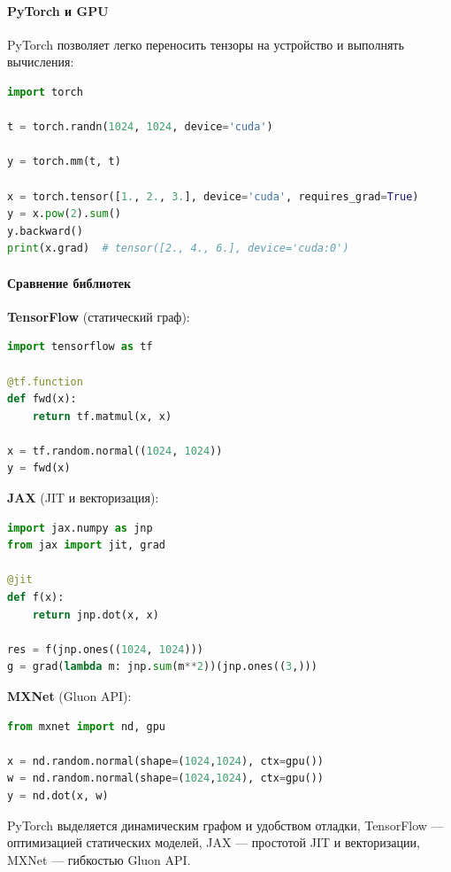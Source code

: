 \paragraph{PyTorch и GPU}
PyTorch позволяет легко переносить тензоры на устройство и выполнять вычисления:

\begin{lstlisting}[language=Python,caption={PyTorch: базовые операции на GPU},label={lst:torch_gpu}]
import torch

t = torch.randn(1024, 1024, device='cuda')

y = torch.mm(t, t)

x = torch.tensor([1., 2., 3.], device='cuda', requires_grad=True)
y = x.pow(2).sum()
y.backward()
print(x.grad)  # tensor([2., 4., 6.], device='cuda:0')
\end{lstlisting}

\paragraph{Сравнение библиотек}
\textbf{TensorFlow} (статический граф):
\begin{lstlisting}[language=Python,caption={TensorFlow: определение и запуск функции},label={lst:tf}]
import tensorflow as tf

@tf.function
def fwd(x):
    return tf.matmul(x, x)

x = tf.random.normal((1024, 1024))
y = fwd(x)
\end{lstlisting}

\textbf{JAX} (JIT и векторизация):
\begin{lstlisting}[language=Python,caption={JAX: JIT-компиляция и градиент},label={lst:jax}]
import jax.numpy as jnp
from jax import jit, grad

@jit
def f(x):
    return jnp.dot(x, x)

res = f(jnp.ones((1024, 1024)))
g = grad(lambda m: jnp.sum(m**2))(jnp.ones((3,)))
\end{lstlisting}

\textbf{MXNet} (Gluon API):
\begin{lstlisting}[language=Python,caption={MXNet: dot-операция на GPU},label={lst:mxnet}]
from mxnet import nd, gpu

x = nd.random.normal(shape=(1024,1024), ctx=gpu())
w = nd.random.normal(shape=(1024,1024), ctx=gpu())
y = nd.dot(x, w)
\end{lstlisting}

PyTorch выделяется динамическим графом и удобством отладки, TensorFlow — оптимизацией статических моделей, JAX — простотой JIT и векторизации, MXNet — гибкостью Gluon API.

